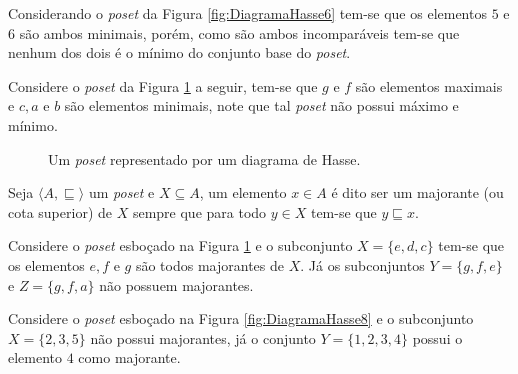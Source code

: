 \begin{example}
	Considerando o \textit{poset} da Figura \ref{fig:DiagramaHasse6} tem-se que os elementos $5$ e $6$ são ambos minimais, porém, como são ambos incomparáveis tem-se que nenhum dos dois é o mínimo do conjunto base do \textit{poset}.
\end{example}

\begin{example}
	Considere o \textit{poset} da Figura \ref{fig:DiagramaHasse9} a seguir, tem-se que $g$ e $f$ são elementos maximais e $c, a$ e $b$ são elementos minimais, note que tal \textit{poset} não possui máximo e mínimo.
	
	\begin{figure}[h]
		\centering
		\caption{Um \textit{poset} representado por um diagrama de Hasse.}
		\label{fig:DiagramaHasse9}
	\end{figure}
\end{example}

\begin{definition}[Majorante]\label{def:Majorante}
	Seja $\langle A, \sqsubseteq \rangle$ um \textit{poset} e $X \subseteq A$, um elemento $x \in A$ é dito ser um majorante (ou cota superior) de $X$ sempre que para todo $y \in X$ tem-se que $y\sqsubseteq x$.
\end{definition}

\begin{example}
	Considere o \textit{poset} esboçado na Figura \ref{fig:DiagramaHasse9} e o subconjunto $X = \{e, d, c\}$ tem-se que os elementos $e, f$ e $g$ são todos majorantes de $X$. Já os subconjuntos $Y = \{g, f, e\}$ e $Z = \{g, f, a\}$ não possuem majorantes.
\end{example}

\begin{example}
	Considere o \textit{poset} esboçado na Figura \ref{fig:DiagramaHasse8} e o subconjunto $X = \{2, 3, 5\}$  não possui majorantes, já o conjunto $Y = \{1,2, 3, 4\}$ possui o elemento $4$ como majorante.
\end{example}

